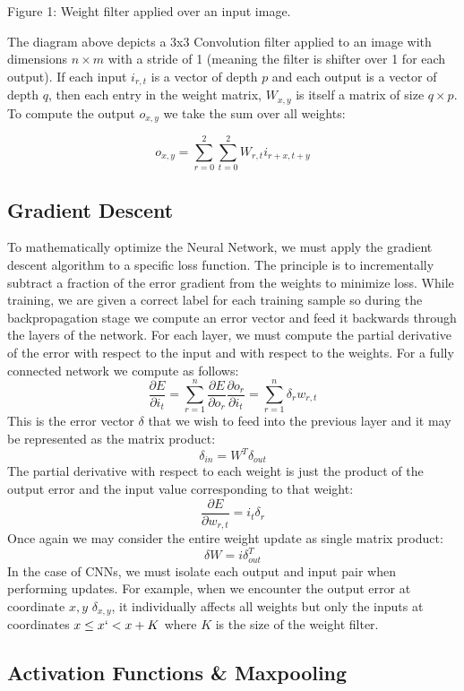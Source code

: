 \documentclass[11pt]{article}
\begin{document}
{Figure 1: Weight filter applied over an input image.\par
}\vspace{11pt}

The diagram above depicts a 3x3 Convolution filter applied to an image with dimensions $n\times m$ with a stride of 1 (meaning the filter is shifter over 1 for each output). If each input $i_{r,t}$ is a vector of depth $p$ and each output is a vector of depth $q$, then each entry in the weight matrix, $W_{x,y}$ is itself a matrix of size $q \times p$. To compute the output $o_{x,y}$ we take the sum over all weights:

$$o_{x,y} = \sum_{r = 0}^2\sum_{t = 0}^2 W_{r,t}i_{r + x,t + y}$$

\subsection{Gradient Descent}
To mathematically optimize the Neural Network, we must apply the gradient descent algorithm to a specific loss function. The principle is to incrementally subtract a fraction of the error gradient from the weights to minimize loss. While training, we are given a correct label for each training sample so during the backpropagation stage we compute an error vector and feed it backwards through the layers of the network. For each layer, we must compute the partial derivative of the error with respect to the input and with respect to the weights. For a fully connected network we compute as follows:
$$\frac{\partial E}{\partial i_t} = \sum_{r=1}^n\frac{\partial E}{\partial o_r} \frac{\partial o_r}{\partial i_t} = \sum_{r=1}^n \delta_r w_{r,t}$$
This is the error vector $\delta$ that we wish to feed into the previous layer and it may be represented as the matrix product:
$$\delta_{in} = W^T\delta_{out}$$
The partial derivative with respect to each weight is just the product of the output error and the input value corresponding to that weight:
$$\frac{\partial E}{\partial w_{r,t}} = i_t\delta_r$$
Once again we may consider the entire weight update as single matrix product:
$$\delta W = i \delta_{out}^T$$
In the case of CNNs, we must isolate each output and input pair when performing updates. For example, when we encounter the output error at coordinate $x,y$ $\delta_{x,y}$, it individually affects all weights but only the inputs at coordinates $x \leq x` < x + K$ where $K$ is the size of the weight filter. 

\subsection{Activation Functions \& Maxpooling}
\end{document}
